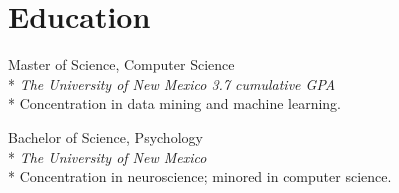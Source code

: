 \documentclass[print]{friggeri-cv} %
\begin{document}
  \iftoggle{cv}{
\begin{description}
  \item  {\largeheaderfont Student Volunteer } {\smallheaderfont \hfill 2008\textemdash 2010} \\*
    {\footnotesize \emph{The Mind Research Network, Albuquerque, NM}} \hfill \\*
    Assisted with a study ran by Pilar Sanjuan, PhD investigating substance use
    and post-traumatic stress disorder (PTSD) in recently returned combat
    veterans. \\*
\end{description}


\begin{description}
  \item  {\largeheaderfont Student Volunteer}  \hfill {\smallheaderfont 2008 } \\*
    {\footnotesize \emph{The University of New Mexico, Albuquerque, NM}\textemdash } \\*
    Assisted Akaysha Tang, PhD, with a study investigating stress regulation in
    rats and assisted an expert in troubleshooting and repairing an EEG system
    for a study investigating stress in humans.\\*
\end{description}
}{} %

\section{Education}
\begin{description}
  \item {\largeheaderfont Master of Science, Computer Science}  \hfill 
    {} \\*
    {\footnotesize \emph{The University of New Mexico  \hfill 3.7 cumulative GPA}} \\*
    Concentration in data mining and machine learning.
\end{description}
\begin{description}
  \item  {\largeheaderfont Bachelor of Science, Psychology } \hfill
    { }\\*
    {\footnotesize \emph{The University of New Mexico  }} \\*
    Concentration in neuroscience; minored in computer science.
\end{description}
\end{document}
